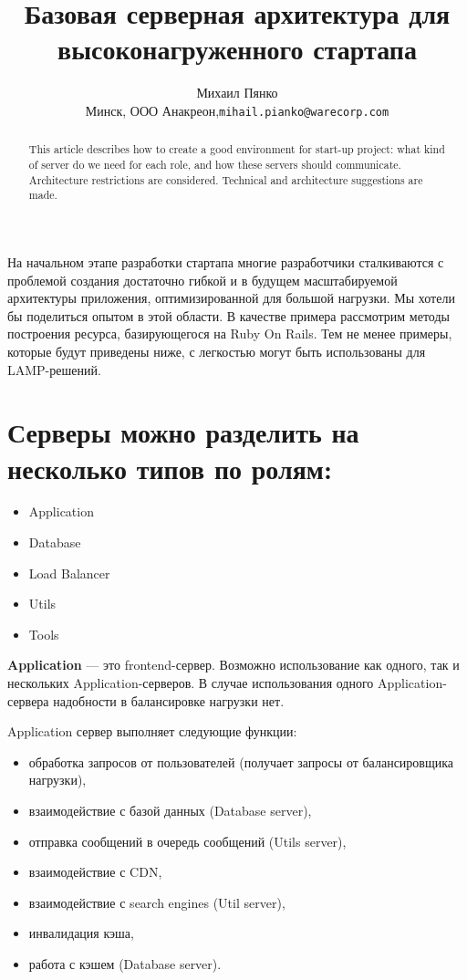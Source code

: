 \documentclass[10pt, a5paper]{article}
\begin{document}
\title{Базовая серверная архитектура для высоконагруженного стартапа}

\author{Михаил Пянко\\
\small Минск, ООО Анакреон,\texttt{mihail.pianko@warecorp.com}
}
\maketitle

\begin{abstract}
This article describes how to create a good environment for start-up project: what kind of server do we need for each role, and how these servers should communicate. Architecture restrictions are considered. Technical and architecture suggestions are made.
\end{abstract}

На начальном этапе разработки стартапа многие разработчики сталкиваются с проблемой создания достаточно гибкой и в будущем масштабируемой архитектуры приложения, оптимизированной для большой нагрузки. Мы хотели бы поделиться опытом в этой области. В качестве примера рассмотрим методы построения ресурса, базирующегося на Ruby On Rails. Тем не менее примеры, которые будут приведены ниже, с легкостью могут быть использованы для LAMP-решений. 

\section*{Серверы можно разделить на несколько типов по ролям:}
\begin{itemize}
\item Application
\item Database 
\item Load Balancer
\item Utils
\item Tools
\end{itemize}

{\bf Application} --- это frontend-сервер. Возможно использование как одного, так и нескольких Application-серверов. В случае использования одного Application-сервера надобности в балансировке нагрузки нет.

Application сервер выполняет следующие функции:
\begin{itemize}
\item обработка запросов от пользователей (получает запросы от балансировщика нагрузки),
\item взаимодействие с базой данных (Database server),
\item отправка сообщений в очередь сообщений (Utils server),
\item взаимодействие с CDN,
\item взаимодействие с search engines (Util server),
\item инвалидация кэша,
\item работа с кэшем (Database server).
\end{itemize}
\end{document}
